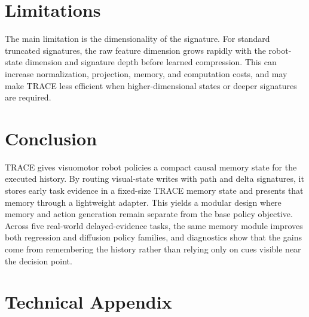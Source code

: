 \documentclass{article}
\begin{document}

\section{Limitations}
\label{sec:limitations}

The main limitation is the dimensionality of the signature. For standard truncated signatures, the raw feature dimension grows rapidly with the robot-state dimension and signature depth before learned compression. This can increase normalization, projection, memory, and computation costs, and may make TRACE less efficient when higher-dimensional states or deeper signatures are required.


\section{Conclusion}
\label{sec:conclusion}

TRACE gives visuomotor robot policies a compact causal memory state for the executed history. By routing visual-state writes with path and delta signatures, it stores early task evidence in a fixed-size TRACE memory state and presents that memory through a lightweight adapter. This yields a modular design where memory and action generation remain separate from the base policy objective. Across five real-world delayed-evidence tasks, the same memory module improves both regression and diffusion policy families, and diagnostics show that the gains come from remembering the history rather than relying only on cues visible near the decision point.




\newpage

\appendix

\section{Technical Appendix}
\label{app:experimental_details}
\end{document}
